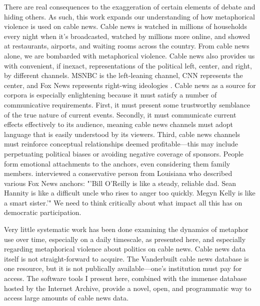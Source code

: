 There are real consequences to the exaggeration of certain elements of debate and
hiding others.  As such, this work expands our understanding of how
metaphorical violence is used on cable news. Cable news is watched in millions
of households every night when it's broadcasted, watched by millions more online, 
and showed at restaurants, airports, and waiting rooms across the country.
From cable news alone, we are bombarded with metaphorical violence. Cable news
also provides us with convenient, if inexact, representations of the 
political left, center, and right, by different channels. MSNBC is the 
left-leaning channel, CNN represents the center, and Fox News represents
right-wing ideologies \cite{Bode2014}. Cable news as a source for corpora is 
especially enlightening
because it must satisfy a number of communicative requirements. First, it must present some
trustworthy semblance of the true nature of current events. Secondly, it must
communicate current effects effectively to its audience, meaning cable news
channels must adopt language that is easily understood by its viewers. Third,
cable news channels must reinforce conceptual relationships deemed profitable---this
may include perpetuating political biases or avoiding negative coverage of
sponsors. People form emotional attachments to the anchors, even considering them
family members.  interviewed a conservative person from
Louisiana who described various Fox News anchors: 
"'Bill O'Reilly is like a steady, reliable dad. Sean Hannity is like a difficult uncle who rises to anger too quickly. Megyn Kelly is like a smart sister.'" We need to think critically
about what impact all this has on democratic participation.

Very little systematic work has been done examining the dynamics of metaphor use over time,  
especially on a daily timescale, as presented here, and especially regarding 
metaphorical violence about politics on cable news. 
Cable news data itself is not straight-forward to 
acquire. The Vanderbuilt cable news database is one resource, but it is 
not publically available---one's institution must pay for access. 
The software tools I present here, combined
with the immense database hosted by the Internet Archive, 
provide a novel, open, and programmatic way to access large amounts of cable news data. 

